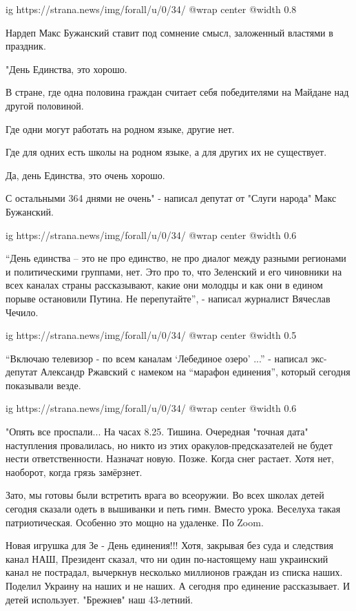\ifcmt
  ig https://strana.news/img/forall/u/0/34/%
  @wrap center
  @width 0.8
\fi

Нардеп Макс Бужанский ставит под сомнение смысл, заложенный властями в
праздник. 

"День Единства, это хорошо.

В стране, где одна половина граждан считает себя победителями на Майдане над
другой половиной.

Где одни могут работать на родном языке, другие нет.

Где для одних есть школы на родном языке, а для других их не существует.

Да, день Единства, это очень хорошо.

С остальными 364 днями не очень" - написал депутат от "Слуги народа" Макс
Бужанский.

\ifcmt
  ig https://strana.news/img/forall/u/0/34/%
  @wrap center
  @width 0.6
\fi

\enquote{День единства – это не про единство, не про диалог между разными регионами и
политическими группами, нет. Это про то, что Зеленский и его чиновники на всех
каналах страны рассказывают, какие они молодцы и как они в едином порыве
остановили Путина. Не перепутайте}, - написал журналист Вячеслав Чечило.

\ifcmt
  ig https://strana.news/img/forall/u/0/34/%
  @wrap center
  @width 0.5
\fi

\enquote{Включаю телевизор - по всем каналам \enquote{Лебединое озеро} ...} - написал
экс-депутат Александр Ржавский с намеком на \enquote{марафон единения}, который
сегодня показывали везде.

\ifcmt
  ig https://strana.news/img/forall/u/0/34/%
  @wrap center
  @width 0.6
\fi

"Опять все проспали... На часах 8.25. Тишина. Очередная "точная дата"
наступления провалилась, но никто из этих оракулов-предсказателей не будет
нести ответственности. Назначат новую. Позже. Когда снег растает. Хотя нет,
наоборот, когда грязь замёрзнет.

Зато, мы готовы были встретить врага во всеоружии. Во всех школах детей сегодня
сказали одеть в вышиванки и петь гимн. Вместо урока. Веселуха такая
патриотическая. Особенно это мощно на удаленке. По Zoom.

Новая игрушка для Зе - День единения!!! Хотя, закрывая без суда и следствия
канал НАШ, Президент сказал, что ни один по-настоящему наш украинский канал не
пострадал, вычеркнув несколько миллионов граждан из списка наших. Поделил
Украину на наших и не наших. А сегодня про единение рассказывает. И детей
использует. "Брежнев" наш 43-летний.

